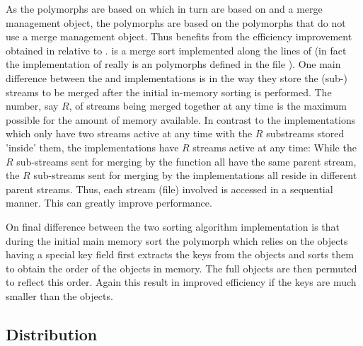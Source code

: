 As the  polymorphs are based on
 which in turn are based on
 and a merge management object, the
 polymorphs are based on the 
polymorphs that do not use a merge management object. Thus
 benefits from the efficiency improvement
obtained in  relative to
.  is a merge sort implemented
along the lines of  (in fact the
implementation of  really is an
 polymorphs defined in the file
). One main difference between the
 and  implementations is in the
way they store the (sub-) streams to be merged after the initial in-memory
sorting is performed. The number, say $R$, of streams being merged together
at any time is the maximum possible for the amount of memory available. In
contrast to the  implementations which only have two
streams active at any time with the $R$ substreams stored 'inside' them,
the  implementations have $R$ streams active at
any time: While the $R$ sub-streams sent for merging by the
 function all have the same parent stream, the $R$
sub-streams sent for merging by the 
implementations all reside in different parent streams. Thus, each stream
(file) involved is accessed in a sequential manner. This can greatly
improve performance.

On final difference between the two sorting algorithm implementation is
that during the initial main memory sort the 
polymorph which relies on the objects having a special key field first
extracts the keys from the objects and sorts them to obtain the order of
the objects in memory. The full objects are then permuted to reflect this
order. Again this result in improved efficiency if the keys are much
smaller than the objects.




\subsection{Distribution}
\label{sec:ref-imp-ami-distribution}

